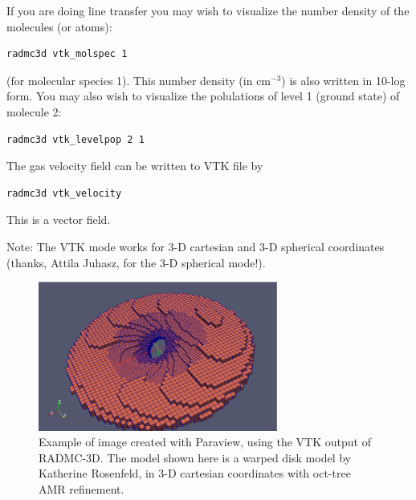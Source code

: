 \documentclass{report}
\newenvironment{asciibox}%
  {\begin{list}{}{%
    \setlength{\topsep}{0.5em}%
    \setlength{\parskip}{0em}%
    \setlength{\parsep}{0em}%
    \setlength{\itemsep}{0em}%
    \setlength{\rightmargin}{0em}%
    \setlength{\leftmargin}{3.0em}%
    \setlength{\labelsep}{1em}%
    \setlength{\labelwidth}{2em}%
  }\normalfont\footnotesize\item}
  {\end{list}}
\begin{document}
If you are doing line transfer you may wish to visualize the number density
of the molecules (or atoms):
\begin{asciibox}\begin{verbatim}
radmc3d vtk_molspec 1
\end{verbatim}\end{asciibox}
(for molecular species 1). This number density (in cm$^{-3}$) is also
written in 10-log form.  You may also wish to visualize the polulations of
level 1 (ground state) of molecule 2:
\begin{asciibox}\begin{verbatim}
radmc3d vtk_levelpop 2 1
\end{verbatim}\end{asciibox}
The gas velocity field can be written to VTK file by
\begin{asciibox}\begin{verbatim}
radmc3d vtk_velocity
\end{verbatim}\end{asciibox}
This is a vector field.

Note: The VTK mode works for 3-D cartesian and 3-D spherical coordinates
(thanks, Attila Juhasz, for the 3-D spherical mode!).


%
\begin{figure}
\centerline{\includegraphics[width=0.7\textwidth]{disk_rosenfeld.eps}}
\caption{\label{fig-disk-with-vtk}
Example of image created with Paraview, using the VTK output of RADMC-3D.
The model shown here is a warped disk model by Katherine Rosenfeld, 
in 3-D cartesian coordinates with oct-tree AMR refinement.
}
\end{figure}
%
\end{document}

